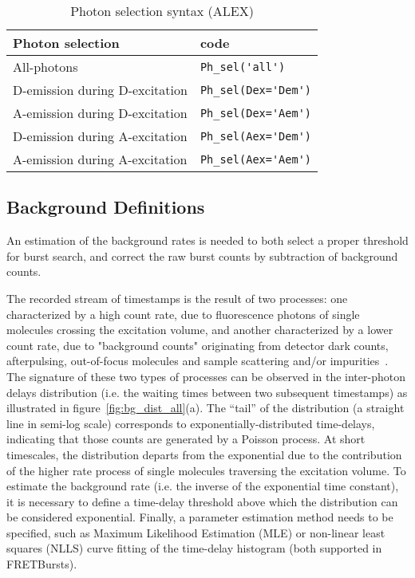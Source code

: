 \begin{table}
\begin{tabular}{l|l}
  Photon selection  & code \\
  \hline
  All-photons & \verb|Ph_sel('all')|\\
  D-emission during D-excitation & \verb|Ph_sel(Dex='Dem')|\\
  A-emission during D-excitation & \verb|Ph_sel(Dex='Aem')|\\
  D-emission during A-excitation & \verb|Ph_sel(Aex='Dem')|\\
  A-emission during A-excitation & \verb|Ph_sel(Aex='Aem')|\\
\end{tabular}
\caption{\label{tab:ph_sel_alex}Photon selection syntax (ALEX)}
\end{table}

\subsection{Background Definitions}
\label{sec:bg_intro}

An estimation of the background rates is needed to both select a proper threshold for
burst search, and correct the raw burst counts by subtraction of background counts.

The recorded stream of timestamps is the result of two processes: one characterized
by a high count rate, due to fluorescence photons of single molecules crossing the
excitation volume, and another characterized by a lower count rate, due to "background
counts" originating from detector dark counts, afterpulsing, out-of-focus molecules
and sample scattering and/or impurities~\cite{Edman_1996,Gopich_2008}.
The signature of these two types of processes can be
observed in the inter-photon delays distribution (i.e. the waiting times
between two subsequent timestamps) as illustrated in figure~\ref{fig:bg_dist_all}(a).
The “tail” of the distribution (a straight line in semi-log scale) corresponds
to exponentially-distributed time-delays, indicating that those counts are generated by a
Poisson process. At short
timescales, the distribution departs from the exponential due to the contribution
of the higher rate process of single molecules traversing the excitation volume.
To estimate the background rate (i.e. the inverse of the exponential time constant),
it is necessary to define a time-delay threshold above which the distribution
can be considered exponential.
Finally, a parameter estimation method needs to be specified, such as Maximum
Likelihood Estimation (MLE) or non-linear least squares (NLLS) curve fitting of 
the time-delay histogram (both supported in FRETBursts).

